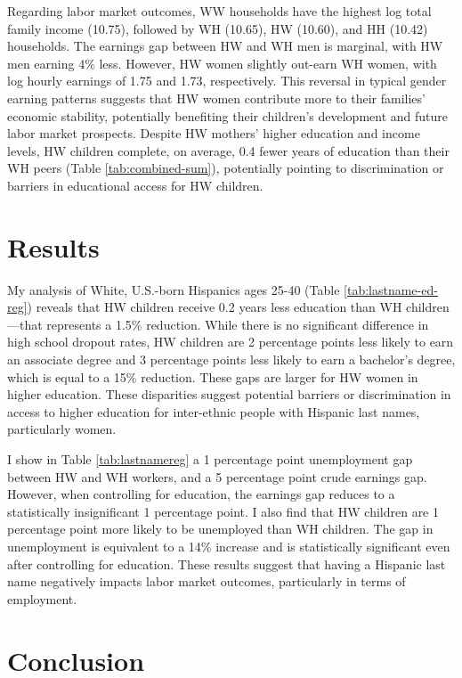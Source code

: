 \documentclass[a4paper,fleqn]{cas-sc}
\begin{document}
Regarding labor market outcomes, WW households have the highest log total family income (10.75), followed by WH (10.65), HW (10.60), and HH (10.42) households. The earnings gap between HW and WH men is marginal, with HW men earning 4\% less. However, HW women slightly out-earn WH women, with log hourly earnings of 1.75 and 1.73, respectively. This reversal in typical gender earning patterns suggests that HW women contribute more to their families' economic stability, potentially benefiting their children's development and future labor market prospects. Despite HW mothers' higher education and income levels, HW children complete, on average, 0.4 fewer years of education than their WH peers (Table \ref{tab:combined-sum}), potentially pointing to discrimination or barriers in educational access for HW children.

\section{Results}\label{sec:results}

My analysis of White, U.S.-born Hispanics ages 25-40 (Table \ref{tab:lastname-ed-reg}) reveals that HW children receive 0.2 years less education than WH children---that represents a 1.5\% reduction. While there is no significant difference in high school dropout rates, HW children are 2 percentage points less likely to earn an associate degree and 3 percentage points less likely to earn a bachelor's degree, which is equal to a 15\% reduction. These gaps are larger for HW women in higher education. These disparities suggest potential barriers or discrimination in access to higher education for inter-ethnic people with Hispanic last names, particularly women.

I show in Table \ref{tab:lastnamereg} a 1 percentage point unemployment gap between HW and WH workers, and a 5 percentage point crude earnings gap. However, when controlling for education, the earnings gap reduces to a statistically insignificant 1 percentage point. I also find that HW children are 1 percentage point more likely to be unemployed than WH children. The gap in unemployment is equivalent to a 14\% increase and is statistically significant even after controlling for education. These results suggest that having a Hispanic last name negatively impacts labor market outcomes, particularly in terms of employment.

\section{Conclusion}\label{sec:con1}
\end{document}
